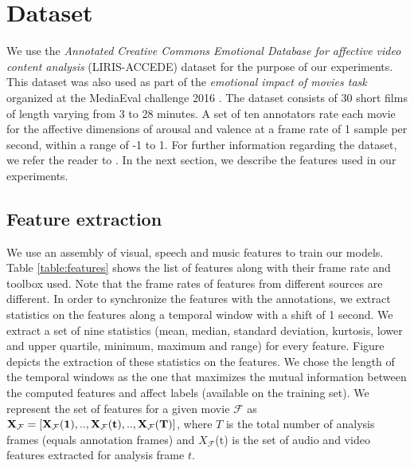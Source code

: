 \documentclass{article}
\begin{document}
\section{Dataset}

We use the {\it Annotated Creative Commons Emotional Database for affective video content analysis} (LIRIS-ACCEDE) dataset for the purpose of our experiments.
This dataset was also used as part of the {\it emotional impact of movies task} organized at the MediaEval challenge 2016 \cite{}.
The dataset consists of 30 short films of length varying from 3 to 28 minutes.
A set of ten annotators rate each movie for the affective dimensions of arousal and valence at a frame rate of 1 sample per second, within a range of -1 to 1. 
For further information regarding the dataset, we refer the reader to \cite{}.
In the next section, we describe the features used in our experiments.

\subsection{Feature extraction} \label{feature_extraction}
We use an assembly of visual, speech and music features to train our models.
Table \ref{table:features} shows the list of features along with their frame rate and toolbox used. 
Note that the frame rates of features from different sources are different.
In order to synchronize the features with the annotations, we extract statistics on the features along a temporal window with a shift of 1 second. 
We extract a set of nine statistics (mean, median, standard deviation, kurtosis, lower and upper quartile, minimum, maximum and range) for every feature. 
Figure \cite{} depicts the extraction of these statistics on the features.
We chose the length of the temporal windows as the one that maximizes the mutual information between the computed features and affect labels (available on the training set).
We represent the set of features for a given movie $\mathcal{F}$ as $\bf X_{\mathcal{F}} = [X_{\mathcal{F}}(1), .., X_{\mathcal{F}}(t), .., X_{\mathcal{F}}(T) ]$, where $T$ is the total number of analysis frames (equals annotation frames) and $X_{\mathcal{F}}$(t) is the set of audio and video features extracted for analysis frame $t$. 
\end{document}
